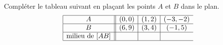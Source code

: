 
\begin{exercice}\label{exosmath-0019}

    Compléter le tableau suivant en plaçant les points \( A\) et \( B\) dans le plan.
    \begin{equation*}
        \begin{array}[]{|c||c|c|c}
            \hline
            A&(0,0)&(1,2)&(-3,-2)\\
            \hline
            B&(6,9)&(3,4)&(-1,5)\\
            \hline
            \text{milieu de \( [AB]\)}&&&\\
            \hline
        \end{array}
    \end{equation*}

\end{exercice}

